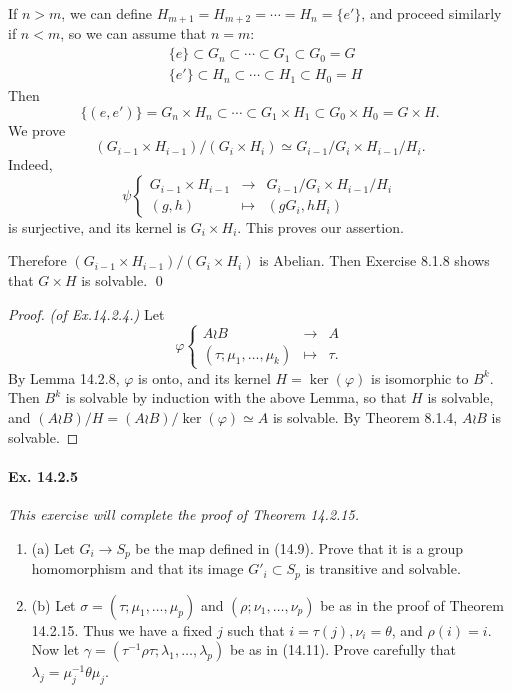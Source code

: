 \documentclass[11pt,a4paper]{article}
\newcommand{\be} {\begin{enumerate}}
\newcommand{\ee} {\end{enumerate}}
\begin{document}
If $n >m$, we can define $H_{m+1} = H_{m+2} =\cdots=H_n=\{e'\}$,  and proceed similarly if $n<m$, so we can assume that $n=m$: 
\begin{align*}
&\{e\} \subset G_n \subset \cdots \subset G_1 \subset G_0 = G\\
&\{e'\} \subset H_n \subset \cdots \subset H_1 \subset H_0 = H
\end{align*}
Then
$$
\{(e,e')\} =G_n\times H_n \subset \cdots \subset G_1\times H_1 \subset G_0\times H_0 = G \times H.
$$
We prove 
$$(G_{i-1}\times H_{i-1}) / (G_i \times H_i) \simeq G_{i-1}/G_i \times H_{i-1}/H_i.$$
Indeed, 
$$
\psi
\left\{
\begin{array}{ccc}
G_{i-1} \times H_{i-1} & \to  & G_{i-1}/G_i \times H_{i-1}/H_i\\
(g,h) & \mapsto & (gG_i, hH_i)
\end{array}
\right.
$$
is surjective, and its kernel is $G_i \times H_i$. This proves our assertion.

Therefore $(G_{i-1}\times H_{i-1}) / (G_i \times H_i)$ is Abelian. Then Exercise 8.1.8 shows that $G\times H $ is solvable.
\qed
\begin{proof} {\it (of Ex.14.2.4.)}
Let 
$$
\varphi
\left\{
\begin{array}{ccc}
A \wr B & \to & A\\
(\tau; \mu_1,\ldots,\mu_k) & \mapsto &\tau.
\end{array}
\right.
$$
By Lemma 14.2.8, $\varphi$ is onto, and its kernel $H = \ker(\varphi)$ is isomorphic to $B^k$. Then $B^k$ is solvable by induction with the above Lemma, so that $H$ is solvable, and $(A \wr B) / H  = (A \wr B)/\ker(\varphi) \simeq A$ is solvable. By Theorem 8.1.4, $A\wr B$ is solvable.
\end{proof}

\paragraph{Ex. 14.2.5}
{\it This exercise will complete the proof of Theorem 14.2.15.
\be
\item[(a)] Let $G_i \to S_p$ be the map defined in (14.9). Prove that it is a group homomorphism and that its image $G'_i \subset S_p$ is transitive and solvable.
\item[(b)] Let $\sigma = (\tau; \mu_1,\ldots,\mu_p)$ and $(\rho;\nu_1,\ldots,\nu_p)$ be as in the proof of Theorem 14.2.15. Thus we have a fixed $j$ such that $i=\tau(j), \nu_i = \theta$, and $\rho(i) = i$. Now let $\gamma = (\tau^{-1} \rho \tau; \lambda_1,\ldots,\lambda_p)$ be as in (14.11). Prove carefully that $\lambda_j = \mu_j^{-1} \theta \mu_j$.
\ee
}
\end{document}
